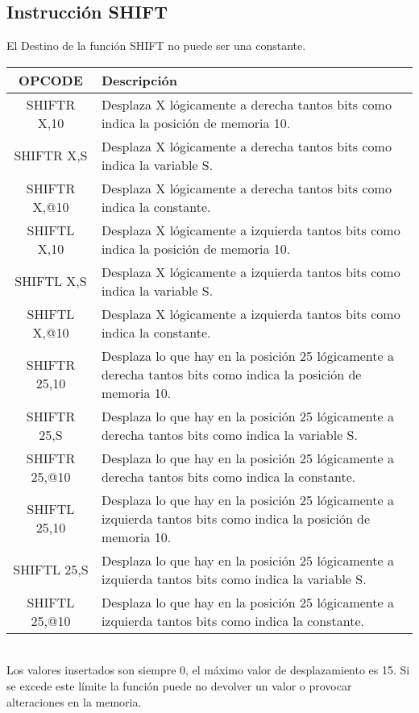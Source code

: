 \documentclass[12pt]{article}
\begin{document}
\subsection{Instrucci\'on SHIFT }
El Destino de la funci\'on SHIFT no puede ser una constante.\\
\begin{tabular}{| c | p{11.5cm}|}
\hline 
OPCODE & Descripci\'on  \\ \hline
SHIFTR X,10 & Desplaza X l\'ogicamente a derecha tantos bits como indica la posici\'on de memoria 10.\\ \hline
SHIFTR X,S  & Desplaza X l\'ogicamente a derecha tantos bits como indica la variable S.\\ \hline
SHIFTR X,@10 & Desplaza X l\'ogicamente a derecha tantos bits como indica la constante.\\ \hline
\hline 
SHIFTL X,10 & Desplaza X l\'ogicamente a izquierda tantos bits como indica la posici\'on de memoria 10.\\ \hline
SHIFTL X,S  & Desplaza X l\'ogicamente a izquierda tantos bits como indica la variable S.\\ \hline
SHIFTL X,@10 & Desplaza X l\'ogicamente a izquierda tantos bits como indica la constante.\\ \hline \hline
SHIFTR 25,10 & Desplaza lo que hay en la posici\'on 25 l\'ogicamente a derecha tantos bits como indica la posici\'on de memoria 10.\\ \hline
SHIFTR 25,S  & Desplaza lo que hay en la posici\'on 25 l\'ogicamente a derecha tantos bits como indica la variable S.\\ \hline
SHIFTR 25,@10 & Desplaza lo que hay en la posici\'on 25 l\'ogicamente a derecha tantos bits como indica la constante.\\ \hline
\hline 
SHIFTL 25,10 & Desplaza lo que hay en la posici\'on 25 l\'ogicamente a izquierda tantos bits como indica la posici\'on de memoria 10.\\ \hline
SHIFTL 25,S  & Desplaza lo que hay en la posici\'on 25 l\'ogicamente a izquierda tantos bits como indica la variable S.\\ \hline
SHIFTL 25,@10 & Desplaza lo que hay en la posici\'on 25 l\'ogicamente a izquierda tantos bits como indica la constante.\\ \hline
\end{tabular}
\\Los valores insertados son siempre 0, el m\'aximo valor de desplazamiento es 15.
Si se excede este l\'imite la funci\'on puede no devolver un valor o provocar alteraciones en la memoria.
\end{document}
